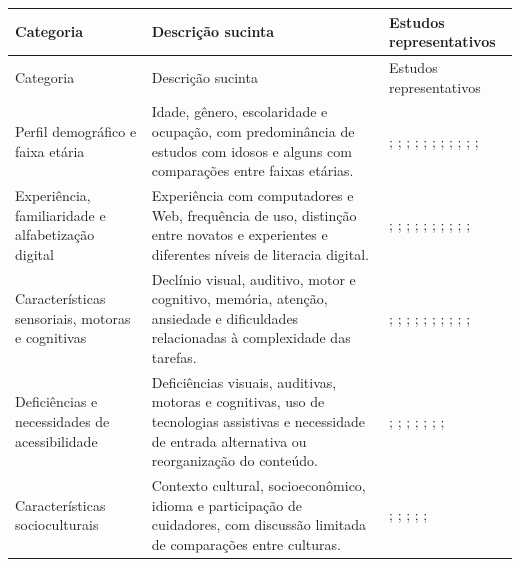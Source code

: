 \begin{longtable}{|p{3.2cm}|p{6cm}|p{5.8cm}|}
\hline
Categoria & Descrição sucinta & Estudos representativos \\ \hline
\endfirsthead
\hline
Categoria & Descrição sucinta & Estudos representativos \\ \hline
\endhead
\hline
\endfoot
\endlastfoot
Perfil demográfico e faixa etária &
Idade, gênero, escolaridade e ocupação, com predominância de estudos com idosos e alguns com comparações entre faixas etárias. &
\cite{zaphiris2003age}; \cite{patsoule2012redesigning}; \cite{hart2008evaluating}; \cite{ko2019old}; \cite{xie2010usability}; \cite{ahmad2013teaching}; \cite{lee2021factors}; \cite{sharit2008information}; \cite{romano2013age}; \cite{crabb2014age}; \cite{arfaa2015usability}; \cite{finn2013usability} \\ \hline
Experiência, familiaridade e alfabetização digital &
Experiência com computadores e Web, frequência de uso, distinção entre novatos e experientes e diferentes níveis de literacia digital. &
\cite{cowan2011exploring}; \cite{sharit2008information}; \cite{mastarone2007access}; \cite{gautam2019adding}; \cite{kusumaningayu2017web}; \cite{nosseir2011novice}; \cite{filgueiras2009recoverability}; \cite{delara2016study}; \cite{lum2016development}; \cite{morash2015guiding}; \cite{esticky2023} \\ \hline
Características sensoriais, motoras e cognitivas &
Declínio visual, auditivo, motor e cognitivo, memória, atenção, ansiedade e dificuldades relacionadas à complexidade das tarefas. &
\cite{park2015personalized}; \cite{biswas2014interface}; \cite{wang2020research}; \cite{breaking_barriers}; \cite{taylor2009using}; \cite{wickramathilaka2023addressing}; \cite{sharit2008information}; \cite{crabb2014age}; \cite{romano2013age}; \cite{duarte2025designing}; \cite{esticky2023} \\ \hline
Deficiências e necessidades de acessibilidade &
Deficiências visuais, auditivas, motoras e cognitivas, uso de tecnologias assistivas e necessidade de entrada alternativa ou reorganização do conteúdo. &
\cite{kouroupetroglou2016methodological}; \cite{breaking_barriers}; \cite{halbach2009framework}; \cite{kusumaningayu2017web}; \cite{duarte2025designing}; \cite{gonzalez2025augmenting}; \cite{mowar2025codea11y}; \cite{ramineni2024enhancing} \\ \hline
Características socioculturais &
Contexto cultural, socioeconômico, idioma e participação de cuidadores, com discussão limitada de comparações entre culturas. &
\cite{ko2019old}; \cite{breaking_barriers}; \cite{nosseir2011novice}; \cite{dombrovskaia2021guideline}; \cite{lee2021factors}; \cite{ahmad2013teaching} \\ \hline

\end{longtable}
